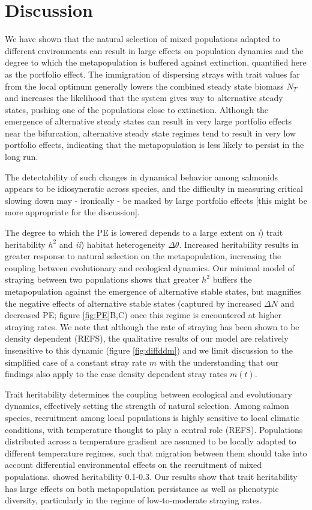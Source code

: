 \documentclass[twocolumn,preprintnumbers,amsmath,amssymb,superscriptaddress]{revtex4}
\begin{document}
\section{Discussion}

We have shown that the natural selection of mixed populations adapted to different environments can result in large effects on population dynamics and the degree to which the metapopulation is buffered against extinction, quantified here as the portfolio effect.
The immigration of dispersing strays with trait values far from the local optimum generally lowers the combined steady state biomass $N_T$ and increases the likelihood that the system gives way to alternative steady states, pushing one of the populations close to extinction.
Although the emergence of alternative steady states can result in very large portfolio effects near the bifurcation, alternative steady state regimes tend to result in very low portfolio effects, indicating that the metapopulation is less likely to persist in the long run.

The detectability of such changes in dynamical behavior among salmonids appears to be idiosyncratic across species, and the difficulty in measuring critical slowing down may - ironically - be masked by large portfolio effects \cite{Krkosek:2014ch} [this might be more appropriate for the discussion].

The degree to which the PE is lowered depends to a large extent on \emph{i}) trait heritability $h^2$ and \emph{ii}) habitat heterogeneity $\Delta \theta$.
Increased heritability results in greater response to natural selection on the metapopulation, increasing the coupling between evolutionary and ecological dynamics. 
Our minimal model of straying between two populations shows that greater $h^2$ buffers the metapopulation against the emergence of alternative stable states, but magnifies the negative effects of alternative stable states (captured by increased $\Delta N$ and decreased PE; figure \ref{fig:PE}B,C) once this regime is encountered at higher straying rates.
We note that although the rate of straying has been shown to be density dependent (REFS), the qualitative results of our model are relatively insensitive to this dynamic (figure \ref{fig:diffddm}) and we limit discussion to the simplified case of a constant stray rate $m$ with the understanding that our findings also apply to the case density dependent stray rates $m(t)$.

Trait heritability determines the coupling between ecological and evolutionary dynamics, effectively setting the strength of natural selection.
Among salmon species, recruitment among local populations is highly sensitive to local climatic conditions, with temperature thought to play a central role (REFS).
Populations distributed across a temperature gradient are assumed to be locally adapted to different temperature regimes, such that migration between them should take into account differential environmental effects on the recruitment of mixed populations.
\citeauthor{Carlson:2008hl} showed heritability 0.1-0.3.
Our results show that trait heritability has large effects on both metapopulation persistance as well as phenotypic diversity, particularly in the regime of low-to-moderate straying rates.
\end{document}
